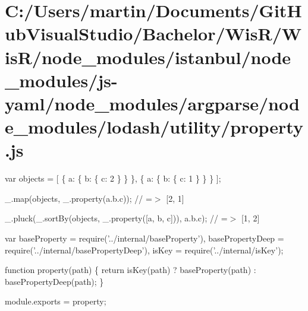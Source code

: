 \hypertarget{_c_1_2_users_2martin_2_documents_2_git_hub_visual_studio_2_bachelor_2_wis_r_2_wis_r_2node_module6bdff6f01818cd25e196d2a7907fa69b}{}\section{C\+:/\+Users/martin/\+Documents/\+Git\+Hub\+Visual\+Studio/\+Bachelor/\+Wis\+R/\+Wis\+R/node\+\_\+modules/istanbul/node\+\_\+modules/js-\/yaml/node\+\_\+modules/argparse/node\+\_\+modules/lodash/utility/property.\+js}
var objects = \mbox{[} \{ \textquotesingle{}a\textquotesingle{}\+: \{ \textquotesingle{}b\textquotesingle{}\+: \{ \textquotesingle{}c\textquotesingle{}\+: 2 \} \} \}, \{ \textquotesingle{}a\textquotesingle{}\+: \{ \textquotesingle{}b\textquotesingle{}\+: \{ \textquotesingle{}c\textquotesingle{}\+: 1 \} \} \} \mbox{]};

\+\_\+.\+map(objects, \+\_\+.\+property(\textquotesingle{}a.\+b.\+c\textquotesingle{})); // =$>$ \mbox{[}2, 1\mbox{]}

\+\_\+.\+pluck(\+\_\+.\+sort\+By(objects, \+\_\+.\+property(\mbox{[}\textquotesingle{}a\textquotesingle{}, \textquotesingle{}b\textquotesingle{}, \textquotesingle{}c\textquotesingle{}\mbox{]})), \textquotesingle{}a.\+b.\+c\textquotesingle{}); // =$>$ \mbox{[}1, 2\mbox{]}


\begin{DoxyCodeInclude}
var baseProperty = require(\textcolor{stringliteral}{'../internal/baseProperty'}),
    basePropertyDeep = require(\textcolor{stringliteral}{'../internal/basePropertyDeep'}),
    isKey = require(\textcolor{stringliteral}{'../internal/isKey'});

\textcolor{keyword}{function} property(path) \{
  \textcolor{keywordflow}{return} isKey(path) ? baseProperty(path) : basePropertyDeep(path);
\}

module.exports = property;
\end{DoxyCodeInclude}
 